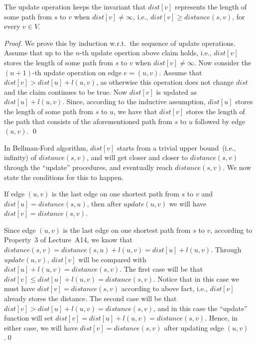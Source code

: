 \begin{fact}
\label{fact2}
The update operation keeps the invariant that $dist[v]$ represents the length of some path from $s$ to $v$ when $dist[v] \neq \infty$, i.e., $dist[v] \ge distance(s,v)$, for every $v\in V$.
\end{fact}
\emph{Proof.} We prove this by induction w.r.t.\ the sequence of update operations. Assume that up to the $n$-th update opertion
above claim holds, i.e., $dist[v]$ stores the length of some path from $s$ to $v$ when $dist[v] \neq \infty$.
Now consider the $(n+1)$-th update operation on edge $e = (u,v)$. Assume that $dist[v] > dist[u] + l(u,v)$, as otherwise this operation does not change $dist$ 
and the claim continues to be true.
Now $dist[v]$ is updated as $dist[u] + l(u,v)$. Since, according to the inductive assumption, $dist[u]$ stores the length of some path from $s$ to $u$,
we have that $dist[v]$ stores the length of the path that consists of the aforementioned path from $s$ to $u$ followed by edge $(u,v)$. \qed

In Bellman-Ford algorithm, $dist[v]$ starts from a trivial upper bound~(i.e., infinity) of $distance(s,v)$,
and will get closer and closer to $distance(s,v)$ through the ``update'' procedures,
and eventually reach $distance(s, v)$.  We now state the conditions for this to happen.

\begin{fact}
\label{fact3}
If edge $(u,v)$ is the last edge on one shortest path from $s$ to $v$ and $dist[u] = distance(s,u)$, then after $update(u,v)$ we will have $dist[v] = distance(s,v)$.
\end{fact}
Since edge $(u,v)$ is the last edge on one shortest path from $s$ to $v$, according to Property~3 of Lecture~A14, we know that
$distance(s,v) = distance(s,u) + l(u,v) = dist[u] + l(u,v)$. Through $update(u,v)$, $dist[v]$ will be compared with $dist[u] + l(u,v) = distance(s,v)$.
The first case will be that $dist[v] \le dist[u] + l(u,v) = distance(s,v)$. Notice that in this case we must have 
$dist[v] = distance(s,v)$ according to above fact, i.e., $dist[v]$ already stores the distance.
The second case will be that $dist[v] > dist[u] + l(u,v) = distance(s,v)$, and in this case the ``update'' function
will set $dist[v] = dist[u] + l(u,v) = distance(s,v)$. 
Hence, in either case, we will have $dist[v] = distance(s,v)$ after updating edge $(u,v)$.\qed


